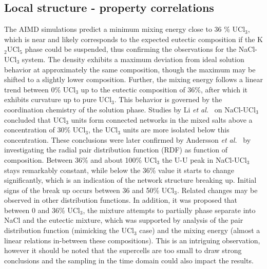 \documentclass[preprint,3p,10pt,twocolumn,number,sort&compress]{elsarticle}
\begin{document}

\subsection{Local structure - property correlations}
The AIMD simulations predict a minimum mixing energy close to 36 \% UCl$_3$, which is near and likely corresponds to the expected eutectic composition if the K$_2$UCl$_5$ phase could be suspended, thus confirming the observations for the NaCl-UCl$_3$ system. The density exhibits a maximum deviation from ideal solution behavior at approximately the same composition, though the maximum may be shifted to a slightly lower composition. Further, the mixing energy follows a linear trend between 0\% UCl$_3$ up to the eutectic composition of 36\%, after which it exhibits curvature up to pure UCl$_3$. This behavior is governed by the coordination chemistry of the solution phase. Studies by Li \textit{et al.}~\cite{Li} on NaCl-UCl$_3$ concluded that UCl$_3$ units form connected networks in the mixed salts above a concentration of 30\% UCl$_3$, the UCl$_3$ units are more isolated below this concentration. These conclusions were later confirmed by Andersson \textit{et al.}~\cite{Andersson} by investigating the radial pair distribution function (RDF) as function of composition. Between 36\% and about 100\% UCl$_3$ the U-U peak in NaCl-UCl$_3$ stays remarkably constant, while below the 36\% value it starts to change significantly, which is an indication of the network structure breaking up. Initial signs of the break up occurs between 36 and 50\% UCl$_3$. Related changes may be observed in other distribution functions. In addition, it was proposed that between 0 and 36\% UCl$_3$, the mixture attempts to partially phase separate into NaCl and the eutectic mixture, which was supported by analysis of the pair distribution function (mimicking the UCl$_3$ case) and the mixing energy (almost a linear relations in-between these compositions). This is an intriguing observation, however it should be noted that the supercells are too small to draw strong conclusions and the sampling in the time domain could also impact the results. 
\end{document}
